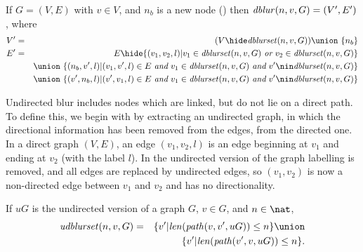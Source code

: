 \documentclass{elsarticle}
\begin{document}
\begin{definition} \label{def:directed-blur}
  If $G = (V,E)$ with $v \in V$, and $n_b$ is a new node () then $\mathit{dblur}(n,v,G) = (V',E')$, where
  \begin{eqnarray*}
  V' &=& (V\hide \dblurset(n,v,G)) \union\ \{n_b\}\\
  E' &=& E\hide \{(v_1,v_2,l)| v_1 \in \dblurset(n,v,G) ~\emph{or}~ v_2 \in \dblurset(n,v,G)\}\\
  &&\union\ \{(n_b,v',l)|(v_1,v',l) \in E ~\emph{and}~ v_1 \in \dblurset(n,v,G) ~\emph{and}~ v' \nin \dblurset(n,v,G) \}\\
  &&\union\ \{(v',n_b,l)|(v',v_1,l) \in E ~\emph{and}~ v_1 \in \dblurset(n,v,G)  ~\emph{and}~ v' \nin \dblurset(n,v,G) \} \\
  \end{eqnarray*}
\end{definition}

Undirected blur includes nodes which are linked, but do not lie on a direct path. 
%
To define this, we begin with by extracting an undirected graph, in which the directional information has been removed from the edges, from the directed one. In a direct graph $(V,E)$, an edge $(v_1,v_2,l)$ is an edge beginning at $v_1$ and ending at $v_2$ (with the label $l$). In the undirected version of the graph labelling is removed, and all edges are replaced by undirected edges, so $(v_1,v_2)$ is now a non-directed edge between $v_1$ and $v_2$ and has no directionality. 




\begin{definition} \label{def:undirected-blurset}
  If $uG$ is the undirected version of a graph $G$, $v \in G$, and $n \in \nat$,
  \begin{eqnarray*}
    \udblurset(n,v,G) & = & \{v'|\len(\Path(v,v',uG)) \leq n\}\union \\
                     &   & \{v'|\len(\Path(v',v,uG)) \leq n\}.
  \end{eqnarray*}
\end{definition}
\end{document}
